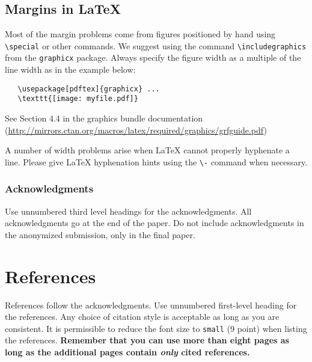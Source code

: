 \documentclass{article}
\begin{document}
\subsection{Margins in \LaTeX{}}

Most of the margin problems come from figures positioned by hand using
\verb+\special+ or other commands. We suggest using the command
\verb+\includegraphics+ from the \verb+graphicx+ package. Always specify the
figure width as a multiple of the line width as in the example below:
\begin{verbatim}
   \usepackage[pdftex]{graphicx} ...
   \texttt{[image: myfile.pdf]}
\end{verbatim}
See Section 4.4 in the graphics bundle documentation
(\url{http://mirrors.ctan.org/macros/latex/required/graphics/grfguide.pdf})

A number of width problems arise when \LaTeX{} cannot properly hyphenate a
line. Please give LaTeX hyphenation hints using the \verb+\-+ command when
necessary.

\subsubsection*{Acknowledgments}

Use unnumbered third level headings for the acknowledgments. All acknowledgments
go at the end of the paper. Do not include acknowledgments in the anonymized
submission, only in the final paper.

\section*{References}

References follow the acknowledgments. Use unnumbered first-level heading for
the references. Any choice of citation style is acceptable as long as you are
consistent. It is permissible to reduce the font size to \verb+small+ (9 point)
when listing the references. {\bf Remember that you can use more than eight
  pages as long as the additional pages contain \emph{only} cited references.}
\medskip

\small

\printbibliography
\end{document}
